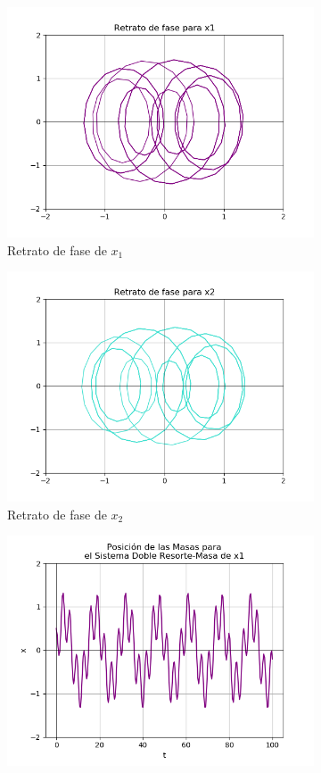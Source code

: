 \documentclass[12pt]{article}
\begin{document}
\begin{figure}[h!]
\begin{subfigure}{.55\textwidth}
  \centering
  \includegraphics[width=.8\linewidth]{Ej2_31.png}
  \caption{Retrato de fase de $x_1$}
  \label{fig:sfig2}
\end{subfigure}
\begin{subfigure}{.55\textwidth}
  \centering
  \includegraphics[width=.8\linewidth]{Ej2_32.png}
  \caption{Retrato de fase de $x_2$}
  \label{fig:sfig2}
\end{subfigure}
\begin{subfigure}{.55\textwidth}
  \centering
  \includegraphics[width=.8\linewidth]{Ej2_33.png}

\end{subfigure}
\end{figure}
\end{document}
